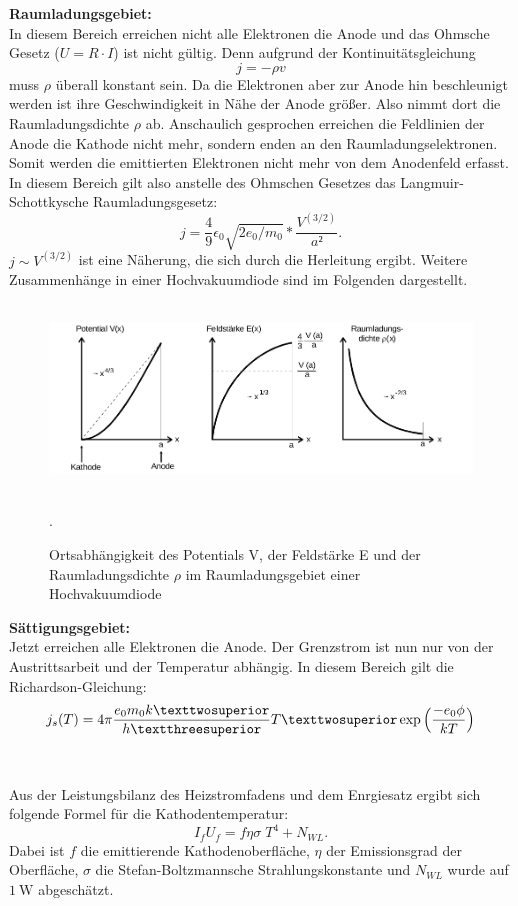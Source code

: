 \textbf{Raumladungsgebiet:}\\
In diesem Bereich erreichen nicht alle Elektronen die Anode und das Ohmsche Gesetz
($U=R\cdot I$) ist nicht gültig. Denn aufgrund der Kontinuitätsgleichung
\begin{equation}
  j=  -\rho v
\end{equation}
muss $\rho$ überall konstant sein. Da die Elektronen aber zur Anode hin beschleunigt werden
ist ihre Geschwindigkeit in Nähe der Anode größer. Also nimmt dort die Raumladungsdichte
$\rho$ ab. Anschaulich gesprochen erreichen die Feldlinien der Anode die Kathode nicht mehr,
sondern enden an den Raumladungselektronen. Somit werden die emittierten Elektronen
nicht mehr von dem Anodenfeld erfasst.
In diesem Bereich gilt also anstelle des Ohmschen Gesetzes das
Langmuir-Schottkysche Raumladungsgesetz:
\begin{equation}
  j=\frac{4}{9}\epsilon_{0}\sqrt{2e_{0}/m_{0}}*\frac{V^{(3/2)}}{a²}.
  \label{eqn:lang}
\end{equation}
$j \sim V^{(3/2)}$ ist eine Näherung, die sich durch die Herleitung ergibt.
 Weitere Zusammenhänge in einer Hochvakuumdiode sind im Folgenden dargestellt.
 \begin{figure}[H]
   \centering
   \includegraphics[height=5cm]{diagramm.png}
   \caption{Ortsabhängigkeit des Potentials V, der Feldstärke E und der Raumladungsdichte $\rho$
   im Raumladungsgebiet einer Hochvakuumdiode}
   \label{fig:diagramm}
   \cite{skript}.
 \end{figure}

\textbf{Sättigungsgebiet:}\\
Jetzt erreichen alle Elektronen die Anode. Der Grenzstrom ist nun nur von der
Austrittsarbeit und der Temperatur abhängig. In diesem Bereich gilt die
Richardson-Gleichung:
\begin{equation}
  j_{s}(T)= 4 \pi \frac{e_{0}m_{0}k²}{h³}T²\exp{\Bigl(\frac{-e_{0}\phi}{kT}\Bigr)}
  \label{eqn:satt}
\end{equation}
\\
\\


Aus der Leistungsbilanz des Heizstromfadens und dem Enrgiesatz ergibt sich folgende Formel
für die Kathodentemperatur:
\begin{equation}
  I_{f}U_{f}=f \eta \sigma\; T^{4}+N_{WL}.
  \label{temperatur}
\end{equation}
Dabei ist $f$ die emittierende Kathodenoberfläche, $\eta$ der Emissionsgrad der Oberfläche,
$\sigma$ die Stefan-Boltzmannsche Strahlungskonstante und $N_{WL}$ wurde auf $\SI{1}{\W}$
abgeschätzt.
\label{sec:Theorie}
